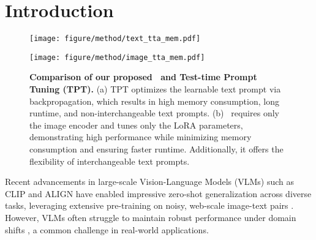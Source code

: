 \section{Introduction}
\label{sec:intro}

\begin{figure}[ht]
    \centering
    \begin{minipage}{\linewidth}
        \centering
        \texttt{[image: figure/method/text\_tta\_mem.pdf]}
        \label{fig:tpt}
    \end{minipage}
    
    \vspace{1em} %

    \begin{minipage}{\linewidth}
        \centering
        \texttt{[image: figure/method/image\_tta\_mem.pdf]}
        \label{fig:image_tta}
    \end{minipage}
    
    \caption{\textbf{Comparison of our proposed \name\ and Test-time Prompt Tuning (TPT).} (a) TPT optimizes the learnable text prompt via backpropagation, which results in high memory consumption, long runtime, and non-interchangeable text prompts. (b) \name\ requires only the image encoder and tunes only the LoRA parameters, demonstrating high performance while minimizing memory consumption and ensuring faster runtime. Additionally, it offers the flexibility of interchangeable text prompts.} 
    \label{fig:concept}
\end{figure}

Recent advancements in large-scale Vision-Language Models (VLMs) such as CLIP \citep{radford2021learning} and ALIGN \citep{jia2021scaling} have enabled impressive zero-shot generalization across diverse tasks, leveraging extensive pre-training on noisy, web-scale image-text pairs \citep{sharma2018conceptual, changpinyo2021conceptual, thomee2016yfcc100m}.
However, VLMs often struggle to maintain robust performance under domain shifts \citep{shu2023clipood, xiao2024any}, a common challenge in real-world applications.

